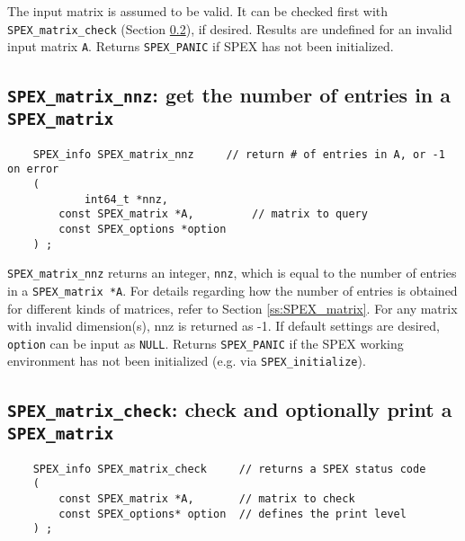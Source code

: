 \documentclass[12pt]{report}
\theoremstyle{definition}
\begin{document}
The input matrix is assumed to be valid. It can be checked first with
\verb|SPEX_matrix_check| (Section \ref{s:user:matrix_check}), if desired.
Results are undefined for an invalid input matrix \verb|A|.  Returns
\verb|SPEX_PANIC| if SPEX has not been initialized.

\cprotect\subsection{\verb|SPEX_matrix_nnz|: get the number of entries in a
\verb|SPEX_matrix|}
\label{s:user:matrix_nnz}

\begin{mdframed}[userdefinedwidth=6in]
{\footnotesize
\begin{verbatim}
    SPEX_info SPEX_matrix_nnz     // return # of entries in A, or -1 on error
    (
    		int64_t *nnz,
        const SPEX_matrix *A,         // matrix to query
        const SPEX_options *option
    ) ;
\end{verbatim}
} \end{mdframed}

\verb|SPEX_matrix_nnz| returns an integer, \verb|nnz|, which is equal to the number of entries in a \verb|SPEX_matrix *A|.
For details regarding how the number of entries is obtained for different kinds
of matrices, refer to Section \ref{ss:SPEX_matrix}.
For any matrix with invalid dimension(s), nnz is returned as -1.
If default settings are desired, \verb|option| can be input as \verb|NULL|.
Returns \verb|SPEX_PANIC| if the SPEX working environment has not been initialized (e.g. via \verb|SPEX_initialize|).

\cprotect\subsection{\verb|SPEX_matrix_check|: check and optionally print a \verb|SPEX_matrix|}
\label{s:user:matrix_check}

\begin{mdframed}[userdefinedwidth=6in]
{\footnotesize
\begin{verbatim}
    SPEX_info SPEX_matrix_check     // returns a SPEX status code
    (
        const SPEX_matrix *A,       // matrix to check
        const SPEX_options* option  // defines the print level
    ) ;
\end{verbatim}
} \end{mdframed}
\end{document}
